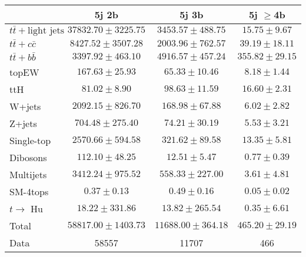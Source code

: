 \begin{table}
\begin{center}
  \begin{tabular}{ | l |  c |  c |  c | }
    \hline \hline 
     & 5j 2b  & 5j 3b  & 5j $\geq$4b  \\ 
    \hline 
     $t\bar{t}+\text{light jets}$  &   $ 37832.70 \pm 3225.75 $ &   $ 3453.57 \pm 488.75 $ &   $ 15.75 \pm 9.67 $ \\ 
     $t\bar{t}+c\bar{c}$  &   $ 8427.52 \pm 3507.28 $ &   $ 2003.96 \pm 762.57 $ &   $ 39.19 \pm 18.11 $ \\ 
     $t\bar{t}+b\bar{b}$  &   $ 3397.92 \pm 463.10 $ &   $ 4916.57 \pm 457.24 $ &   $ 355.82 \pm 29.15 $ \\ 
    topEW  &   $ 167.63 \pm 25.93 $ &   $ 65.33 \pm 10.46 $ &   $ 8.18 \pm 1.44 $ \\ 
    ttH  &   $ 81.02 \pm 8.90 $ &   $ 98.63 \pm 11.59 $ &   $ 16.60 \pm 2.31 $ \\ 
    W+jets  &   $ 2092.15 \pm 826.70 $ &   $ 168.98 \pm 67.88 $ &   $ 6.02 \pm 2.82 $ \\ 
    Z+jets  &   $ 704.48 \pm 275.40 $ &   $ 74.21 \pm 30.19 $ &   $ 5.53 \pm 3.21 $ \\ 
    Single-top  &   $ 2570.66 \pm 594.58 $ &   $ 321.62 \pm 89.58 $ &   $ 13.35 \pm 5.81 $ \\ 
    Dibosons  &   $ 112.10 \pm 48.25 $ &   $ 12.51 \pm 5.47 $ &   $ 0.77 \pm 0.39 $ \\ 
    Multijets  &   $ 3412.24 \pm 975.52 $ &   $ 558.33 \pm 227.00 $ &   $ 3.61 \pm 4.81 $ \\ 
    SM-4tops  &   $ 0.37 \pm 0.13 $ &   $ 0.49 \pm 0.16 $ &   $ 0.05 \pm 0.02 $ \\ 
     $t\rightarrow$ Hu  &   $ 18.22 \pm 331.86 $ &   $ 13.82 \pm 265.54 $ &   $ 0.35 \pm 6.61 $ \\ 
    Total  &   $ 58817.00 \pm 1403.73 $ &   $ 11688.00 \pm 364.18 $ &   $ 465.20 \pm 29.19 $ \\ 
    \hline 
    Data  & 58557  & 11707  & 466  \\ 
    \hline \hline 
  \end{tabular} 



\end{center}
\end{table}
